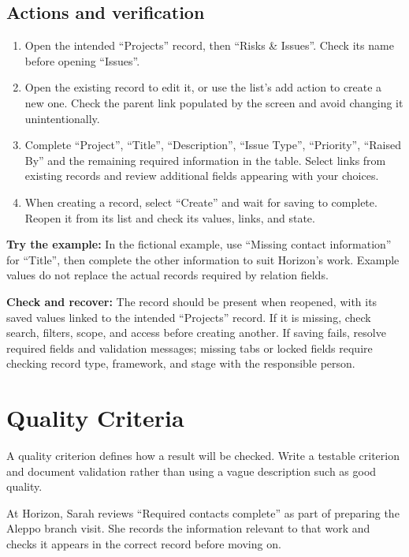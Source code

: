 \subsection{Actions and verification}
\begin{enumerate}
\item Open the intended “Projects” record, then “Risks \& Issues”. Check its name before opening “Issues”.
\item Open the existing record to edit it, or use the list's add action to create a new one. Check the parent link populated by the screen and avoid changing it unintentionally.
\item Complete “Project”, “Title”, “Description”, “Issue Type”, “Priority”, “Raised By” and the remaining required information in the table. Select links from existing records and review additional fields appearing with your choices.
\item When creating a record, select “Create” and wait for saving to complete. Reopen it from its list and check its values, links, and state.
\end{enumerate}

\textbf{Try the example:} In the fictional example, use “Missing contact information” for “Title”, then complete the other information to suit Horizon's work. Example values do not replace the actual records required by relation fields.

\textbf{Check and recover:} The record should be present when reopened, with its saved values linked to the intended “Projects” record. If it is missing, check search, filters, scope, and access before creating another. If saving fails, resolve required fields and validation messages; missing tabs or locked fields require checking record type, framework, and stage with the responsible person.

\clearpage
\section{Quality Criteria}
\label{sec:projects-feature-quality-criteria}

A quality criterion defines how a result will be checked. Write a testable criterion and document validation rather than using a vague description such as good quality.

\begin{rcnote}
At Horizon, Sarah reviews “Required contacts complete” as part of preparing the Aleppo branch visit. She records the information relevant to that work and checks it appears in the correct record before moving on.
\end{rcnote}

